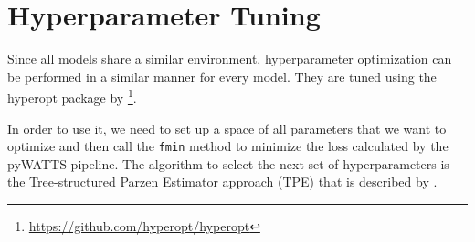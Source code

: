 \section{Hyperparameter Tuning}

Since all models share a similar environment, 
hyperparameter optimization can be performed in a similar manner for every model.
They are tuned using the 
hyperopt package by \Textcite{Bergstra2013}\footnote{\url{https://github.com/hyperopt/hyperopt}}.

In order to use it, we need to set up a space of 
all parameters that we want to optimize and 
then call the \texttt{fmin} method to minimize the loss 
calculated by the pyWATTS pipeline. 
The algorithm to select the next set of hyperparameters is 
the Tree-structured Parzen Estimator approach (TPE) 
that is described by \Textcite{Bergstra2011}.